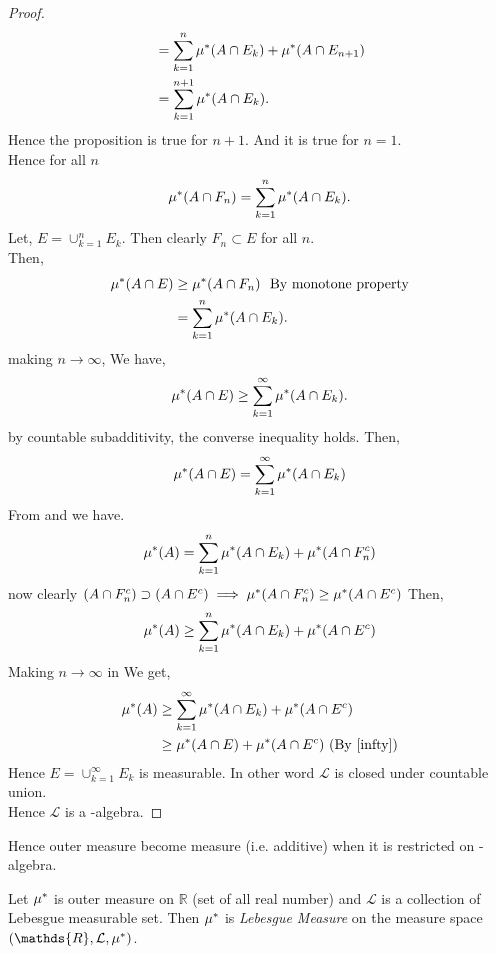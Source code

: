 \begin{proof}
\begin{align*}
                           &=\sum_{k=1}^{n}\mu^{*}(A\cap E_k)+\mu^{*}(A\cap E_{n+1})\\
                           &=\sum_{k=1}^{n+1}\mu^{*}(A\cap E_k).
    \end{align*}
    Hence the proposition is true for $n+1$. And it is true for  $n=1$.\\
    Hence for all $n$
    \begin{equation}
        \label{FnEn}
        \mu^{*}(A\cap F_n)=\sum_{k=1}^{n}\mu^{*}(A\cap E_k).
    \end{equation}
    Let, $E=\cup_{k=1}^{n}E_k$. Then clearly $F_n\subset E$ for all $n$.\\
    Then, 
    \begin{align*}
        \mu^{*}(A\cap E)&\ge \mu^{*}(A\cap F_n) \ \text{ By monotone property}\\
                     &=\sum_{k=1}^{n}\mu^{*}(A\cap E_k).
    \end{align*}
    making  $n\to\infty$, We have,
    \begin{align*}
        \mu^{*}(A\cap E)\ge \sum_{k=1}^{\infty}\mu^{*}(A\cap E_k).
    \end{align*}
    by countable subadditivity, the converse inequality holds. Then,
    \begin{equation}
        \label{infty}
        \mu^{*}(A\cap E)=\sum_{k=1}^{\infty}\mu^{*}(A\cap E_k)
    \end{equation}
    From  and  we have.
    \begin{equation}
        \mu^{*}(A)=\sum_{k=1}^{n}\mu^{*}(A\cap E_k)+\mu^{*}(A\cap F_n^{c})
    \end{equation}
    now clearly $(A\cap F_n^{c})\supset (A\cap E^{c})\implies\mu^{*}(A\cap F_n^{c})\ge \mu^{*}(A\cap E^{c})$
    Then,
    \begin{equation}
        \label{EnE}
        \mu^{*}(A)\ge \sum_{k=1}^{n}\mu^{*}(A\cap E_k)+\mu^{*}(A\cap E^{c})
    \end{equation}
    Making $n\to\infty$ in  We get,
    \begin{align*}
        \smu(A)&\ge \sum_{k=1}^{\infty}\smu(A\cap E_k)+\smu(A\cap E^{c})\\
               &\ge \smu(A\cap E)+\smu(A\cap E^{c}) \ (\text{By \refeq{infty}})
    \end{align*}
    Hence $E=\cup_{k=1}^{\infty}E_k$ is measurable. In other word $\mathcal{L}$ is closed under countable union.\\
    Hence $\mathcal{L}$ is a \sig-algebra.
\end{proof}
Hence outer measure become measure (i.e. additive) when it is restricted on \sig-algebra.
\begin{definition}
    Let $\mu^{*}$ is outer measure on  $\mathds{R}$ (set of all real number) and $\mathcal{L}$ is a collection of Lebesgue measurable set.
    Then $\mu^{*}$ is \textit{Lebesgue Measure} on the measure space $(\mathds{R},\mathcal{L},\smu)$.
\end{definition}

